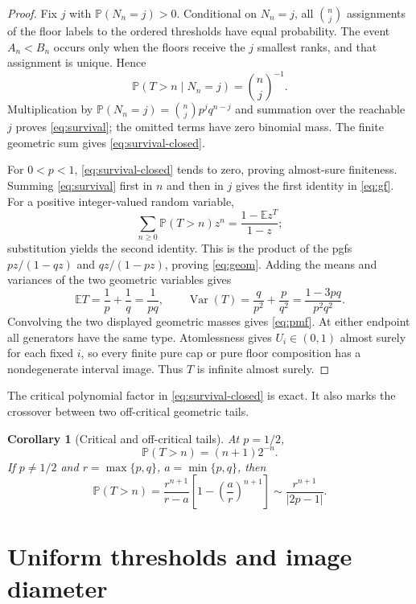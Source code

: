 \documentclass[11pt,a4paper]{amsart}
\newtheorem{corollary}[theorem]{Corollary}
\theoremstyle{definition}
\theoremstyle{remark}
\newcommand{\Prob}{\mathbb P}
\newcommand{\Exp}{\mathbb E}
\begin{document}
\begin{proof}
Fix $j$ with $\Prob(N_n=j)>0$.  Conditional on $N_n=j$, all $\binom nj$
assignments of the floor labels to the ordered thresholds have equal
probability.  The event $A_n<B_n$ occurs only when the floors receive the
$j$ smallest ranks, and that assignment is unique.  Hence
\[
 \Prob(T>n\mid N_n=j)=\binom nj^{-1}.
\]
Multiplication by $\Prob(N_n=j)=\binom njp^jq^{n-j}$ and summation over
the reachable $j$ proves \eqref{eq:survival}; the omitted terms have zero
binomial mass.  The finite geometric sum gives
\eqref{eq:survival-closed}.

For $0<p<1$, \eqref{eq:survival-closed} tends to zero, proving almost-sure
finiteness.  Summing \eqref{eq:survival} first in $n$ and then in $j$
gives the first identity in \eqref{eq:gf}.  For a positive
integer-valued random variable,
\[
 \sum_{n\geq0}\Prob(T>n)z^n=\frac{1-\Exp z^T}{1-z};
\]
substitution yields the second identity.  This is the product of the pgfs
$pz/(1-qz)$ and $qz/(1-pz)$, proving \eqref{eq:geom}.  Adding the means and
variances of the two geometric variables gives
\[
 \Exp T=\frac1p+\frac1q=\frac1{pq},\qquad
 \operatorname{Var}(T)=\frac q{p^2}+\frac p{q^2}
   =\frac{1-3pq}{p^2q^2}.
\]
Convolving the two displayed geometric masses gives \eqref{eq:pmf}.
At either endpoint all generators have the same type.  Atomlessness gives
$U_i\in(0,1)$ almost surely for each fixed $i$, so every finite pure cap or
pure floor composition has a nondegenerate interval image.  Thus $T$ is
infinite almost surely.
\end{proof}

The critical polynomial factor in \eqref{eq:survival-closed} is exact.  It
also marks the crossover between two off-critical geometric tails.

\begin{corollary}[Critical and off-critical tails]\label{cor:tails}
At $p=1/2$,
\[
 \Prob(T>n)=(n+1)2^{-n}.
\]
If $p\neq1/2$ and $r=\max\{p,q\}$, $a=\min\{p,q\}$, then
\begin{equation}\label{eq:offcritical}
 \Prob(T>n)=\frac{r^{n+1}}{r-a}
 \left[1-\left(\frac ar\right)^{n+1}\right]
 \sim\frac{r^{n+1}}{|2p-1|}.
\end{equation}
\end{corollary}

\section{Uniform thresholds and image diameter}
\label{sec:diameter}
\end{document}
